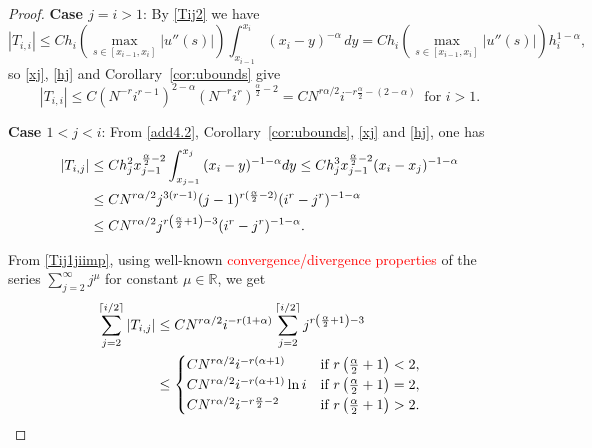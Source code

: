 \documentclass[smallextended]{svjour3}       %
\newcommand{\tcr}[1]{\textcolor{red}{#1}}
\begin{document}
\begin{proof}
	\textbf{Case $j=i>1$}:
	By \eqref{Tij2} we have
	\[
	|T_{i,i}| \le C h_i \left(\max_{s\in [x_{i-1},x_i]} \left| u''(s)\right|\right) \int_{x_{i-1}}^{x_i}{(x_i-y)^{-\alpha}\,dy}
	= C h_i  \left(\max_{s\in [x_{i-1},x_i]} \left| u''(s)\right|\right) h_i^{1-\alpha},
	\]
	so \eqref{xj}, \eqref{hj} and Corollary~\ref{cor:ubounds} give
	\begin{equation}\label{Tiiimp}
		|T_{i,i}|\le C \left(N^{-r}i^{r-1}\right)^{2-\alpha} \left(N^{-r}i^r\right)^{\frac{\alpha}{2}-2}
		= C N^{r\alpha/2} i^{-r\frac{\alpha}{2}-(2-\alpha)}\ \text{ for } i>1.
	\end{equation}
	
	
	\textbf{Case $1< j < i$}:
	From  \eqref{add4.2}, Corollary~\ref{cor:ubounds}, \eqref{xj} and  \eqref{hj},  one has
	\begin{align}%
		\left| T_{i,j} \right|
		& \leq Ch_j^2 x_{j-1}^{\frac{\alpha}{2}-2} \int_{x_{j-1}}^{x_{j}}{(x_i-y)^{-1-\alpha}dy}
		\leq C h_j^3 x_{j-1}^{\frac{\alpha}{2}-2} (x_i-x_j)^{-1-\alpha}  \notag\\
		& \leq C N^{r\alpha/2} j^{3(r-1)}(j-1)^{r(\frac{\alpha}{2}-2)} (i^r-j^r)^{-1-\alpha}  \notag\\
		& \leq CN^{r\alpha/2} j^{r\left(\frac{\alpha}{2}+1\right)-3} (i^r-j^r)^{-1-\alpha}.  \label{Tij1jiimp}
	\end{align}
	
From \eqref{Tij1jiimp}, 
using well-known \tcr{convergence/divergence properties}  of the series
$\sum_{j=2}^\infty j^{\mu}$ for 
constant $\mu\in\mathbb{R}$, we get
	\begin{align}%
		\sum_{j=2}^{\lceil i/2 \rceil}{\left| T_{i,j} \right|}
		&\le CN^{r\alpha/2} i^{-r(1+\alpha)} \sum_{j=2}^{\lceil i/2 \rceil} j^{r\left(\frac{\alpha}{2}+1\right)-3} \notag\\
		&\le \begin{cases}
			C  N^{r\alpha/2} i^{-r(\alpha+1)}  &\text{if }  r\left(\frac{\alpha}{2}+1\right)<2, \\
			C  N^{r\alpha/2} i^{-r(\alpha+1)} \ln i &\text{if }  r\left(\frac{\alpha}{2}+1\right)=2, \\
			C  N^{r\alpha/2} i^{-r\frac{\alpha}{2}-2} &\text{if }  r\left(\frac{\alpha}{2}+1\right)>2.
		\end{cases} \label{4.7imp}
	\end{align}
	

\end{proof}
\end{document}
